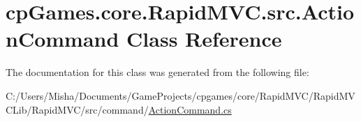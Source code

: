 \hypertarget{classcp_games_1_1core_1_1_rapid_m_v_c_1_1src_1_1_action_command}{}\section{cp\+Games.\+core.\+Rapid\+M\+V\+C.\+src.\+Action\+Command Class Reference}
\label{classcp_games_1_1core_1_1_rapid_m_v_c_1_1src_1_1_action_command}


The documentation for this class was generated from the following file\+:\begin{DoxyCompactItemize}
\item 
C\+:/\+Users/\+Misha/\+Documents/\+Game\+Projects/cpgames/core/\+Rapid\+M\+V\+C/\+Rapid\+M\+V\+C\+Lib/\+Rapid\+M\+V\+C/src/command/\mbox{\hyperlink{_action_command_8cs}{Action\+Command.\+cs}}\end{DoxyCompactItemize}
